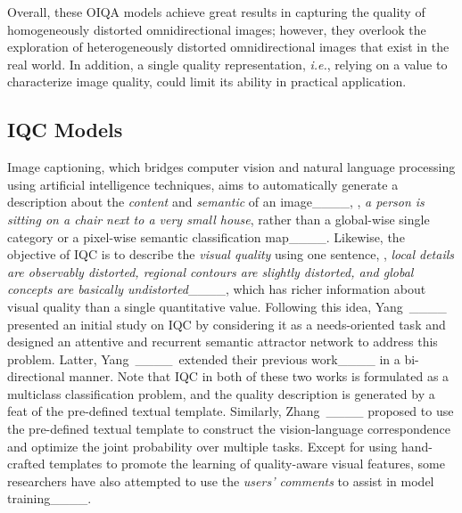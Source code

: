 Overall, these OIQA models achieve great results in capturing the quality of homogeneously distorted omnidirectional images; however, they overlook the exploration of heterogeneously distorted omnidirectional images that exist in the real world. In addition, a single quality representation, \emph{i.e.}, relying on a value to characterize image quality, could limit its ability in practical application.
\subsection{IQC Models}
\label{subsec:iqc_method}

Image captioning, which bridges computer vision and natural language processing using artificial intelligence techniques, aims to automatically generate a description about the \textit{content} and \textit{semantic} of an image____, \eg, \textit{a person is sitting on a chair next to a very small house}, rather than a global-wise single category or a pixel-wise semantic classification map____. Likewise, the objective of IQC is to describe the \textit{visual quality} using one sentence, \eg, \textit{local details are observably distorted, regional contours are slightly distorted, and global concepts are basically undistorted}____, which has richer information about visual quality than a single quantitative value. Following this idea, Yang~\et____ presented an initial study on IQC by considering it as a needs-oriented task and designed an attentive and recurrent semantic attractor network to address this problem. Latter, Yang~\et____~extended their previous work____ in a bi-directional manner. Note that IQC in both of these two works is formulated as a multiclass classification problem, and the quality description is generated by a feat of the pre-defined textual template. Similarly, Zhang~\et____ proposed to use the pre-defined textual template to construct the vision-language correspondence and optimize the joint probability over multiple tasks. Except for using hand-crafted templates to promote the learning of quality-aware visual features, some researchers have also attempted to use the \textit{users' comments} to assist in model training____. 



